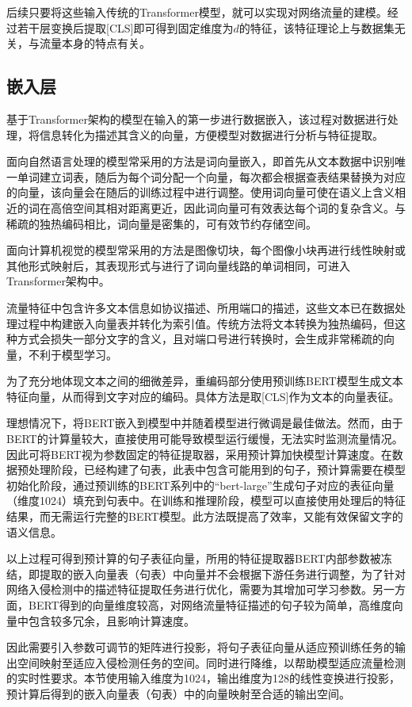 后续只要将这些输入传统的Transformer模型，就可以实现对网络流量的建模。经过若干层变换后提取[CLS]即可得到固定维度为$d$的特征，该特征理论上与数据集无关，与流量本身的特点有关。

\subsection{嵌入层}
基于Transformer架构的模型在输入的第一步进行数据嵌入，该过程对数据进行处理，将信息转化为描述其含义的向量，方便模型对数据进行分析与特征提取。

面向自然语言处理的模型常采用的方法是词向量嵌入，即首先从文本数据中识别唯一单词建立词表，随后为每个词分配一个向量，每次都会根据查表结果替换为对应的向量，该向量会在随后的训练过程中进行调整。使用词向量可使在语义上含义相近的词在高倍空间其相对距离更近，因此词向量可有效表达每个词的复杂含义。与稀疏的独热编码相比，词向量是密集的，可有效节约存储空间。

面向计算机视觉的模型常采用的方法是图像切块，每个图像小块再进行线性映射或其他形式映射后，其表现形式与进行了词向量线路的单词相同，可进入Transformer架构中。

流量特征中包含许多文本信息如协议描述、所用端口的描述，这些文本已在数据处理过程中构建嵌入向量表并转化为索引值。传统方法将文本转换为独热编码，但这种方式会损失一部分文字的含义，且对端口号进行转换时，会生成非常稀疏的向量，不利于模型学习。

为了充分地体现文本之间的细微差异，重编码部分使用预训练BERT模型生成文本特征向量，从而得到文字对应的编码。具体方法是取[CLS]作为文本的向量表征。

理想情况下，将BERT嵌入到模型中并随着模型进行微调是最佳做法。然而，由于BERT的计算量较大，直接使用可能导致模型运行缓慢，无法实时监测流量情况。因此可将BERT视为参数固定的特征提取器，采用预计算加快模型计算速度。在数据预处理阶段，已经构建了句表，此表中包含可能用到的句子，预计算需要在模型初始化阶段，通过预训练的BERT系列中的“bert-large”生成句子对应的表征向量（维度1024）填充到句表中。在训练和推理阶段，模型可以直接使用处理后的特征结果，而无需运行完整的BERT模型。此方法既提高了效率，又能有效保留文字的语义信息。

以上过程可得到预计算的句子表征向量，所用的特征提取器BERT内部参数被冻结，即提取的嵌入向量表（句表）中向量并不会根据下游任务进行调整，为了针对网络入侵检测中的描述特征提取任务进行优化，需要为其增加可学习参数。另一方面，BERT得到的向量维度较高，对网络流量特征描述的句子较为简单，高维度向量中包含较多冗余，且影响计算速度。

因此需要引入参数可调节的矩阵进行投影，将句子表征向量从适应预训练任务的输出空间映射至适应入侵检测任务的空间。同时进行降维，以帮助模型适应流量检测的实时性要求。本节使用输入维度为1024，输出维度为128的线性变换进行投影，预计算后得到的嵌入向量表（句表）中的向量映射至合适的输出空间。

